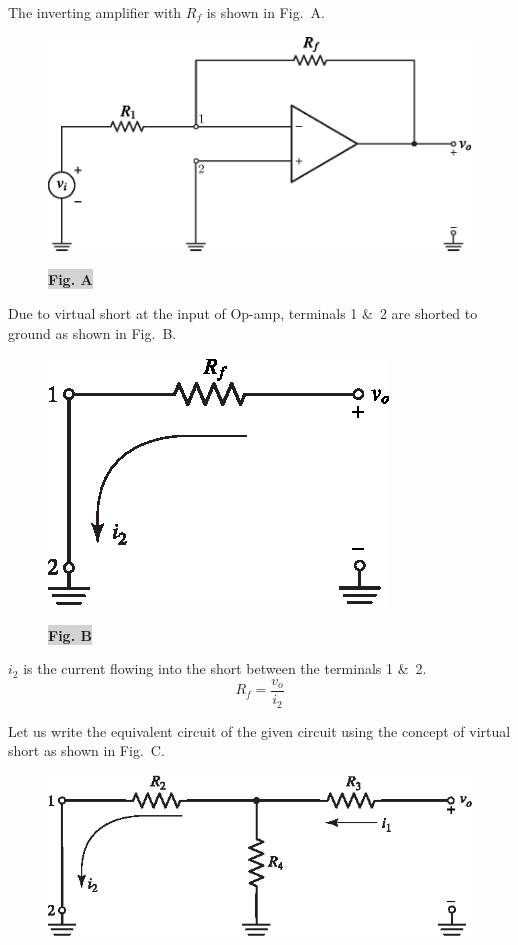 \eject

\begin{solution}
The inverting amplifier with $R_{f}$ is shown in Fig.~A.
\begin{figure}[H]
\centering
\includegraphics{chap4/S3-EE-06-IN006.eps}

\medskip
\bigskip
\colorbox{lightgray}{\bf Fig. A}
\end{figure}

Due to virtual short at the input of Op-amp, terminals 1 \&\ 2 are shorted to ground as shown in Fig.~B.
\begin{figure}[H]
\centering
\includegraphics[scale=1.35]{chap4/S3-EE-06-015.eps}

\medskip
\bigskip
\colorbox{lightgray}{\bf Fig. B}
\end{figure}

\noindent
$i_{2}$ is the current flowing into the short between the terminals 1 \&\ 2.
\begin{equation*}
R_{f}=\frac{v_{o}}{i_{2}}\tag{A}
\end{equation*}

\eject

Let us write the equivalent circuit of the given circuit using the concept of virtual short as shown in Fig.~C.
\begin{figure}[H]
\centering
\includegraphics{chap4/S3-EE-06-016.eps}


\end{figure}
\end{solution}
